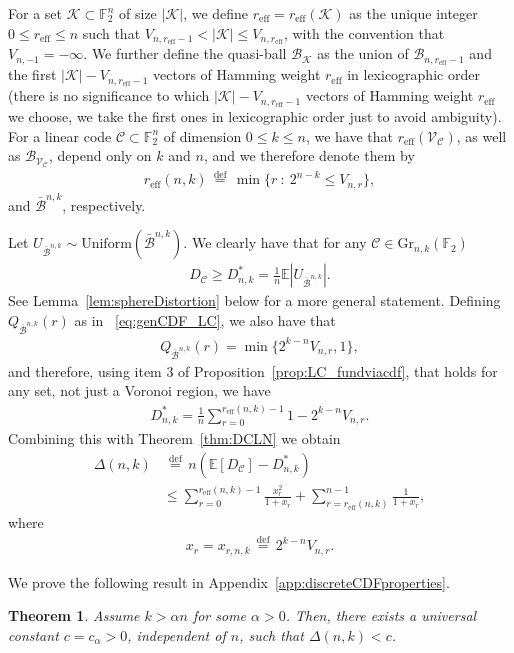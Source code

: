 \documentclass[article,doublecolumn]{IEEEtran}
\newcommand{\F}{{\mathbb{F}}}
\newcommand{\EE}{{\mathbb{E}}}
\newcommand{\df}{{\, \stackrel{\mathrm{def}}{=}\, }}
\newcommand{\BB}{{\mathcal{B}}}
\newcommand{\CC}{{\mathcal{C}}}
\newcommand{\Gr}{{\mathrm{Gr}}}
\newcommand{\Unif}{\mathrm{Uniform}}
\newcommand{\KK}{{\mathcal{K}}}
\newcommand{\reff}{{r_{\mathrm{eff}}}}
\newcommand{\VC}{\mathcal{V}_{\mathcal{C}}}
\newcommand{\Beq}{\bar{\BB}^{n,k}}
\newtheorem{thm}{Theorem}[section]
\begin{document}
For a set $\KK\subset\F_2^n$ of size $|\KK|$, we define $\reff=\reff(\KK)$ as the unique integer $0\leq \reff\leq n$ such that $V_{n,\reff-1}<|\KK|\leq V_{n,\reff}$, with the convention that $V_{n,-1}=-\infty$. We further define the quasi-ball $\BB_\KK$ as the union of $\BB_{n,\reff-1}$ and the first $|\KK|-V_{n,\reff-1}$ vectors of Hamming weight $\reff$ in lexicographic order (there is no significance to which $|\KK|-V_{n,\reff-1}$ vectors of Hamming weight $\reff$ we choose, we take the first ones in lexicographic order just to avoid ambiguity). For a linear code $\CC\subset\F_2^n$ of dimension $0\leq k\leq n$, we have that $\reff(\VC)$, as well as $\BB_{\VC}$, depend only on $k$ and $n$, and we therefore denote them by
\begin{align}
\reff(n,k)\df\min\{r~:~2^{n-k}\leq V_{n,r}    \},
\label{eq:reffnkdef}
\end{align}
and $\Beq$, respectively. 

Let $U_{\Beq}\sim\Unif(\Beq)$. We clearly have that for any $\CC\in\Gr_{n,k}(\F_2)$ 
\begin{align}
D_\CC\geq D^*_{n,k}=\frac{1}{n}\EE |U_{\Beq}|.    
\end{align}
See Lemma~\ref{lem:sphereDistortion} below for a more general statement.
Defining $Q_{\Beq}(r)$ as in ~\eqref{eq:genCDF_LC}, we also have that
\begin{align}
Q_{\Beq}(r)=\min\{2^{k-n}V_{n,r},1\},    
\label{eq:discreteBallCDF}
\end{align}
and therefore, using item 3 of Proposition~\ref{prop:LC_fundviacdf}, that holds for any set, not just a Voronoi region, we have
\begin{align}
D^*_{n,k}=\frac{1}{n}\sum_{r=0}^{\reff(n,k)-1} 1- 2^{k-n}V_{n,r}. 
\label{eq:DnkDef}
\end{align}
Combining this with Theorem~\ref{thm:DCLN} we obtain
\begin{align}
\Delta(n,k)&\df n(\EE[D_\CC]-D^*_{n,k})\\
&\leq\sum_{r=0}^{\reff(n,k)-1}\frac{x_r^2}{1+x_r}+\sum_{r=\reff(n,k)}^{n-1} \frac{1}{1+x_r},   
\label{eq:Deltank}
\end{align}
where
\begin{align}
x_r=x_{r,n,k}\df 2^{k-n} V_{n,r}.    
\label{eq:xrdef}
\end{align}

We prove the following result in Appendix~\ref{app:discreteCDFproperties}.

\begin{thm}
Assume $k>\alpha n$ for some $\alpha>0$. Then, there exists a universal constant $c=c_{
\alpha}>0$, independent of $n$, such that $\Delta(n,k)<c$.    
\label{thm:DcConstantGap}
\end{thm}
\end{document}
